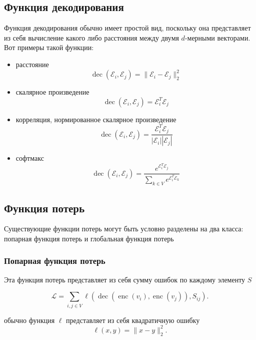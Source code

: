 \documentclass[12pt,a4paper]{extarticle}
\newcommand{\E}{\mathcal{E}}
\newcommand{\Loss}{\mathcal{L}}
\newcommand{\encoder}{\operatorname{enc}}
\newcommand{\decoder}{\operatorname{dec}}
\begin{document}
    \subsection{Функция декодирования}
    Функция декодирования обычно имеет простой вид, поскольку она представляет из себя вычисление какого либо расстояния между двумя $d$-мерными векторами. Вот примеры такой функции:
    \begin{itemize}
        \item расстояние
            \begin{equation} \label{dec_dist}
            \decoder(\E_i, \E_j) = \lVert \E_i - \E_j \rVert_2 ^ 2
            \end{equation}
        \item скалярное произведение
            \begin{equation} \label{dec_scal}
            \decoder(\E_i, \E_j) = \E_i^T\E_j
            \end{equation}
        \item корреляция, нормированное скалярное произведение
            \begin{equation} \label{corr}
            \decoder(\E_i, \E_j) =  \frac{\E_i^T\E_j}{|\E_i||\E_j|}
            \end{equation}
        \item софтмакс
            \[\decoder(\E_i, \E_j) = \frac{e^{\E_i^T\E_j}}{\sum_{k \in V} e^{\E_i^T\E_k}}\]
    \end{itemize}
    
    \subsection{Функция потерь}
    Существующие функции потерь могут быть условно разделены на два класса: попарная функция потерь и глобальная функция потерь
    
    \subsubsection{Попарная функция потерь}
    Эта функция потерь представляет из себя сумму ошибок по каждому элементу $S$
    
    \begin{equation} \label{pair_loss}
        \Loss = \sum_{i, j \in V} \ell (\decoder(\encoder(v_i), \encoder(v_j)), S_{ij}).
    \end{equation}
    
    обычно функция $\ell$ представляет из себя квадратичную ошибку 
    \begin{equation} \label{pair_loss_dist}
    \ell(x, y) = \lVert x - y \rVert_2^2.
    \end{equation}
    
\end{document}
